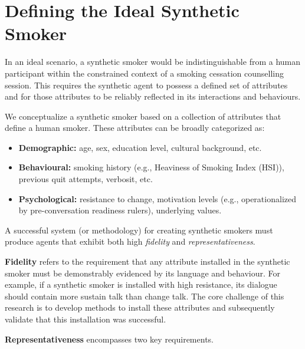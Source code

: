 \section{Defining the Ideal Synthetic Smoker}
\label{sec:synthetic-smoker-ideal}

In an ideal scenario, a synthetic smoker would be indistinguishable from a human participant within the constrained context of a smoking cessation counselling session. This requires the synthetic agent to possess a defined set of attributes and for those attributes to be reliably reflected in its interactions and behaviours.

We conceptualize a synthetic smoker based on a collection of attributes that define a human smoker. These attributes can be broadly categorized as:

\begin{itemize}
    \item \textbf{Demographic:} age, sex, education level, cultural background, etc.
    \item \textbf{Behavioural:} smoking history (e.g., Heaviness of Smoking Index (HSI)), previous quit attempts, verbosit, etc.
    \item \textbf{Psychological:} resistance to change, motivation levels (e.g., operationalized by pre-conversation readiness rulers), underlying values.
\end{itemize}

A successful system (or methodology) for creating synthetic smokers must produce agents that exhibit both high \emph{fidelity} and \emph{representativeness}.

\textbf{Fidelity} refers to the requirement that any attribute installed in the synthetic smoker must be demonstrably evidenced by its language and behaviour. For example, if a synthetic smoker is installed with high resistance, its dialogue should contain more sustain talk than change talk. The core challenge of this research is to develop methods to install these attributes and subsequently validate that this installation was successful.

\textbf{Representativeness} encompasses two key requirements. 

